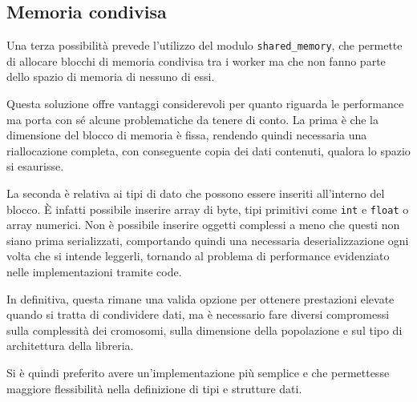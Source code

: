 % 	


\subsection*{Memoria condivisa}

Una terza possibilità prevede l'utilizzo del modulo \verb|shared_memory|, che
permette di allocare blocchi di memoria condivisa tra i worker ma che non
fanno parte dello spazio di memoria di nessuno di essi.

Questa soluzione offre vantaggi considerevoli per quanto riguarda le performance
ma porta con sé alcune problematiche da tenere di conto. La prima è che la
dimensione del blocco di memoria è fissa, rendendo quindi necessaria una
riallocazione completa, con conseguente copia dei dati contenuti, qualora lo
spazio si esaurisse.

La seconda è relativa ai tipi di dato che possono essere inseriti all'interno
del blocco. È infatti possibile inserire array di byte, tipi primitivi come
\verb|int| e \verb|float| o array numerici. Non è possibile inserire oggetti
complessi a meno che questi non siano prima serializzati, comportando quindi
una necessaria deserializzazione ogni volta che si intende leggerli, tornando
al problema di performance evidenziato nelle implementazioni tramite code.

In definitiva, questa rimane una valida opzione per ottenere prestazioni elevate
quando si tratta di condividere dati, ma è necessario fare diversi compromessi
sulla complessità dei cromosomi, sulla dimensione della popolazione e sul tipo
di architettura della libreria.

Si è quindi preferito avere un'implementazione più semplice e che permettesse
maggiore flessibilità nella definizione di tipi e strutture dati.